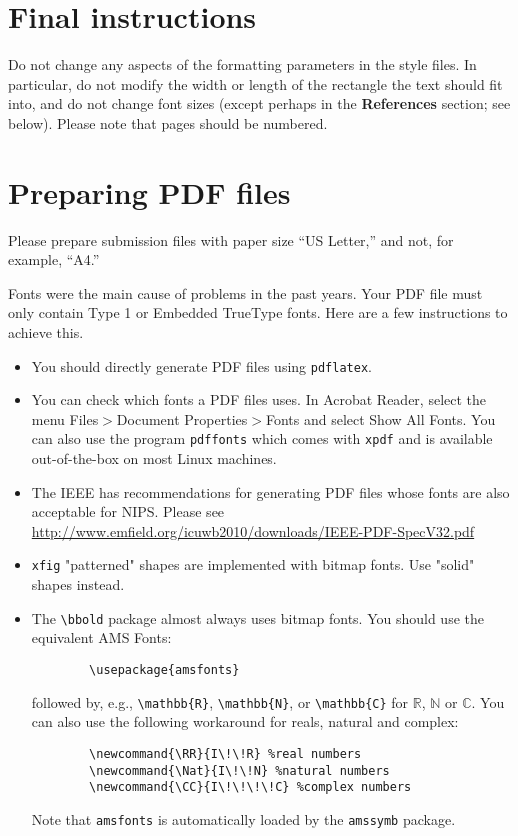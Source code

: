 \documentclass{article}
\begin{document}
	\section{Final instructions}
	
	Do not change any aspects of the formatting parameters in the style
	files.  In particular, do not modify the width or length of the
	rectangle the text should fit into, and do not change font sizes
	(except perhaps in the \textbf{References} section; see below). Please
	note that pages should be numbered.
	
	\section{Preparing PDF files}
	
	Please prepare submission files with paper size ``US Letter,'' and
	not, for example, ``A4.''
	
	Fonts were the main cause of problems in the past years. Your PDF file
	must only contain Type 1 or Embedded TrueType fonts. Here are a few
	instructions to achieve this.
	
	\begin{itemize}
		
		\item You should directly generate PDF files using \verb+pdflatex+.
		
		\item You can check which fonts a PDF files uses.  In Acrobat Reader,
		select the menu Files$>$Document Properties$>$Fonts and select Show
		All Fonts. You can also use the program \verb+pdffonts+ which comes
		with \verb+xpdf+ and is available out-of-the-box on most Linux
		machines.
		
		\item The IEEE has recommendations for generating PDF files whose
		fonts are also acceptable for NIPS. Please see
		\url{http://www.emfield.org/icuwb2010/downloads/IEEE-PDF-SpecV32.pdf}
		
		\item \verb+xfig+ "patterned" shapes are implemented with bitmap
		fonts.  Use "solid" shapes instead.
		
		\item The \verb+\bbold+ package almost always uses bitmap fonts.  You
		should use the equivalent AMS Fonts:
		\begin{verbatim}
		\usepackage{amsfonts}
		\end{verbatim}
		followed by, e.g., \verb+\mathbb{R}+, \verb+\mathbb{N}+, or
		\verb+\mathbb{C}+ for $\mathbb{R}$, $\mathbb{N}$ or $\mathbb{C}$.  You
		can also use the following workaround for reals, natural and complex:
		\begin{verbatim}
		\newcommand{\RR}{I\!\!R} %real numbers
		\newcommand{\Nat}{I\!\!N} %natural numbers
		\newcommand{\CC}{I\!\!\!\!C} %complex numbers
		\end{verbatim}
		Note that \verb+amsfonts+ is automatically loaded by the
		\verb+amssymb+ package.
		
	\end{itemize}
	
\end{document}
